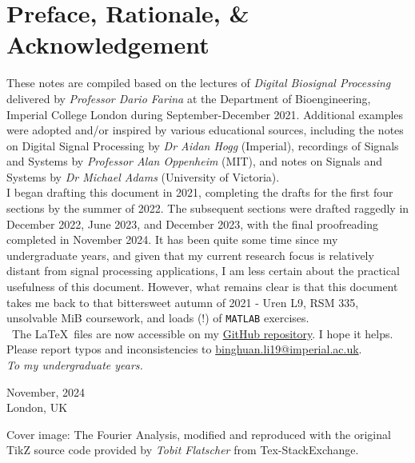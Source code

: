 \section*{Preface, Rationale, \& Acknowledgement}
These notes are compiled based on the lectures of \textit{Digital Biosignal Processing} delivered by \textit{Professor Dario Farina} at the Department of Bioengineering, Imperial College London during September-December 2021. Additional examples were adopted and/or inspired by various educational sources, including the notes on Digital Signal Processing by \textit{Dr Aidan Hogg} (Imperial), recordings of Signals and Systems by \textit{Professor Alan Oppenheim} (MIT), and notes on Signals and Systems by \textit{Dr Michael Adams} (University of Victoria). \\

I began drafting this document in 2021, completing the drafts for the first four sections by the summer of 2022. The subsequent sections were drafted raggedly in December 2022, June 2023, and December 2023, with the final proofreading completed in November 2024. It has been quite some time since my undergraduate years, and given that my current research focus is relatively distant from signal processing applications, I am less certain about the practical usefulness of this document. However, what remains clear is that this document takes me back to that bittersweet autumn of 2021 - Uren L9, RSM 335, unsolvable MiB coursework, and loads (!) of \texttt{MATLAB} exercises.\\

\faGithub \ The \LaTeX \ files are now accessible on my \href{https://github.com/binghuan-li/Notes-and-Formula-Sheets}{GitHub repository}. I hope it helps. Please report typos and inconsistencies to \href{mailto:binghuan.li19@imperial.ac.uk}{binghuan.li19@imperial.ac.uk}. \\

\textit{To my undergraduate years.}

\begin{flushright}
November, 2024\\
London, UK
\end{flushright}

\vfill
{\color{gray}
Cover image: The Fourier Analysis, modified and reproduced with the original TikZ source code provided by \textit{Tobit Flatscher} from Tex-StackExchange.
}